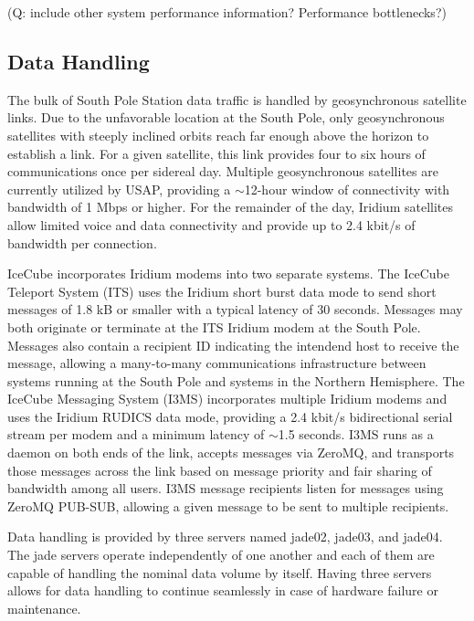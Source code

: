 (Q: include other system performance information?  Performance bottlenecks?)

\subsection{Data Handling}

The bulk of South Pole Station data traffic is handled by geosynchronous satellite links.  Due to the unfavorable
location at the South Pole, only geosynchronous satellites with steeply inclined orbits reach far enough above the
horizon to establish a link.  For a given satellite, this link provides four to six hours of communications once per
sidereal day.  Multiple geosynchronous satellites are currently utilized by USAP, providing a $\sim$12-hour window
of connectivity with bandwidth of 1 Mbps or higher.  For the remainder of the day, Iridium satellites allow
limited voice and data connectivity and provide up to 2.4 kbit/s of bandwidth per connection.

IceCube incorporates Iridium modems into two separate systems.  The IceCube Teleport System (ITS) uses the Iridium short burst
data mode to send short messages of 1.8 kB or smaller with a typical latency of 30 seconds.  Messages may both originate or terminate
at the ITS Iridium modem at the South Pole.  Messages also contain a recipient ID indicating the intendend host to receive
the message, allowing a many-to-many communications infrastructure between systems running at the South Pole and systems
in the Northern Hemisphere.  The IceCube Messaging System (I3MS) incorporates multiple Iridium modems and uses the Iridium RUDICS
data mode, providing a 2.4 kbit/s bidirectional serial stream per modem and a minimum latency of $\sim$1.5 seconds.
I3MS runs as a daemon on both ends of the link, accepts messages via ZeroMQ, and transports those messages across the link
based on message priority and fair sharing of bandwidth among all users.  I3MS message recipients listen for messages
using ZeroMQ PUB-SUB, allowing a given message to be sent to multiple recipients.


Data handling is provided by three servers named jade02, jade03, and jade04. The jade servers operate independently of one another and
each of them are capable of handling the nominal data volume by itself. Having three servers allows for data handling to continue seamlessly
in case of hardware failure or maintenance.

